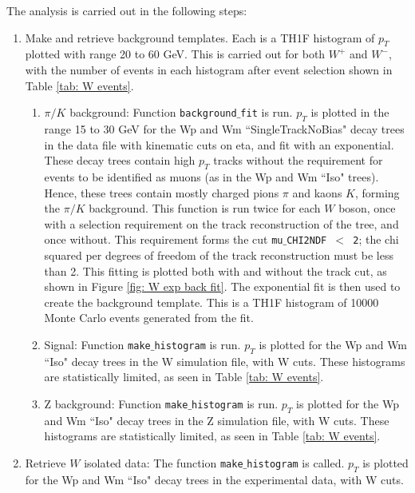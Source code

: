 \documentclass[a4paper]{article}
\begin{document}
The analysis is carried out in the following steps:
\begin{enumerate}
    \item Make and retrieve background templates. Each is a TH1F histogram of $p_T$ plotted with range 20 to 60 GeV. This is carried out for both $W^+$ and $W^-$, with the number of events in each histogram after event selection shown in Table \ref{tab: W events}.
    \begin{enumerate}
        \item $\pi/K$ background: Function \texttt{background$\_$fit} is run. $p_T$ is plotted in the range 15 to 30 GeV for the Wp and Wm ``SingleTrackNoBias" decay trees in the data file with kinematic cuts on eta, and fit with an exponential. These decay trees contain high $p_T$ tracks without the requirement for events to be identified as muons (as in the Wp and Wm ``Iso" trees). Hence, these trees contain mostly charged pions $\pi$ and kaons $K$, forming the $\pi/K$ background.
          \newline This function is run twice for each $W$ boson, once with a selection requirement on the track reconstruction of the tree, and once without. This requirement forms the cut \texttt{mu$\_$CHI2NDF $<$ 2}; the chi squared per degrees of freedom of the track reconstruction must be less than 2. This fitting is plotted both with and without the track cut, as shown in Figure \ref{fig: W exp back fit}.
          \newline The exponential fit is then used to create the background template. This is a TH1F histogram of 10000 Monte Carlo events generated from the fit.
        \item Signal: Function \texttt{make$\_$histogram} is run. $p_T$ is plotted for the Wp and Wm ``Iso" decay trees in the W simulation file, with W cuts. These histograms are statistically limited, as seen in Table \ref{tab: W events}.
        \item Z background: Function \texttt{make$\_$histogram} is run. $p_T$ is plotted for the Wp and Wm ``Iso" decay trees in the Z simulation file, with W cuts. These histograms are statistically limited, as seen in Table \ref{tab: W events}.
    \end{enumerate}
    
    \item Retrieve $W$ isolated data: The function \texttt{make$\_$histogram} is called. $p_T$ is plotted for the Wp and Wm ``Iso" decay trees in the experimental data, with W cuts.
    

\end{enumerate}
\end{document}
